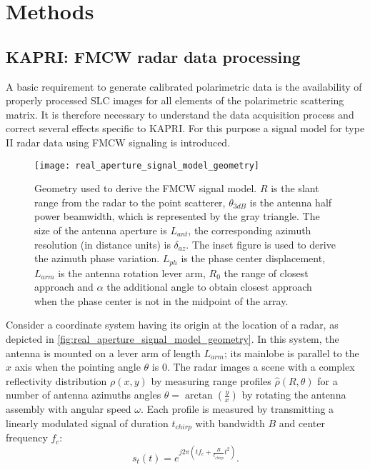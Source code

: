 \section{Methods}\label{sec:methods}
\subsection{KAPRI: FMCW radar data processing}\label{sec:proc_SLC}
A basic requirement to generate calibrated polarimetric data is the availability of properly processed SLC images for all elements of the polarimetric scattering matrix. It is therefore necessary to understand the data acquisition process and correct several effects specific to KAPRI.  
For this purpose a signal model for type II\cite{Caduff2015} radar data using FMCW signaling\cite{Stove1992} is introduced.\\
\begin{figure}[h]
	\centering
	\texttt{[image: real\_aperture\_signal\_model\_geometry]}
	\caption{Geometry used to derive the FMCW signal model. $R$ is the slant range from the radar to the point scatterer, $\theta_{3dB}$ is the antenna half power beamwidth, which is represented by the gray triangle. The size of the antenna aperture is $L_{ant}$, the corresponding azimuth resolution (in distance units) is $\delta_{az}$. The inset figure is used to derive the azimuth phase variation. $L_{ph}$ is the phase center displacement, $L_{arm}$ is the antenna rotation lever arm, $R_{0}$ the range of closest approach and $\alpha$ the additional angle to obtain closest approach when the phase center is not in the midpoint of the array.}
	\label{fig:real_aperture_signal_model_geometry}
\end{figure}
Consider a coordinate system having its origin at the location of a radar, as depicted in \autoref{fig:real_aperture_signal_model_geometry}. In this system, the antenna is mounted on a lever arm of length $L_{arm}$; its mainlobe is parallel to the $x$ axis when the pointing angle $\theta$ is 0. The radar images a scene with a complex reflectivity distribution $\rho\left(x,y\right)$ by measuring range profiles $\hat{\rho}\left(R, \theta\right)$ for a number of antenna azimuths angles $\theta = \operatorname{arctan}\left(\frac{y}{x}\right)$ by rotating the antenna assembly with angular speed $\omega$. Each profile is measured by transmitting a linearly modulated signal of duration $t_{chirp}$ with bandwidth $B$ and center frequency $f_c$:
\begin{equation}
	s_t\left(t\right) = e^{j 2 \pi \left( t f_{c} +  \frac{B}{t_{chirp}} t^2 \right)}.
\end{equation}
